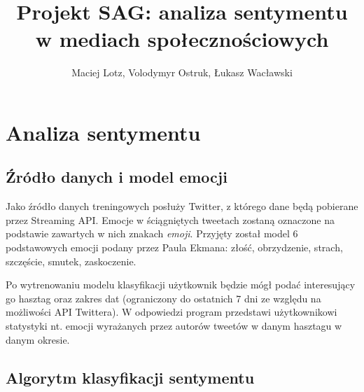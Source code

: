\documentclass{article}
\begin{document}
\title{Projekt SAG: analiza sentymentu w mediach społecznościowych}

\author{Maciej Lotz, Volodymyr Ostruk, Łukasz Wacławski}

\maketitle


\section{Analiza sentymentu}

\subsection{Źródło danych i model emocji}
Jako źródło danych treningowych posłuży Twitter, z którego dane będą pobierane przez Streaming API. Emocje w ściągniętych tweetach zostaną oznaczone na podstawie zawartych w nich znakach \emph{emoji}. Przyjęty został model 6 podstawowych emocji podany przez Paula Ekmana: złość, obrzydzenie, strach, szczęście, smutek, zaskoczenie.

Po wytrenowaniu modelu klasyfikacji użytkownik będzie mógł podać interesujący go hasztag oraz zakres dat (ograniczony do ostatnich 7 dni ze względu na możliwości API Twittera). W odpowiedzi program przedstawi użytkownikowi statystyki nt. emocji wyrażanych przez autorów tweetów w danym hasztagu w danym okresie.

\subsection{Algorytm klasyfikacji sentymentu}
\end{document}
